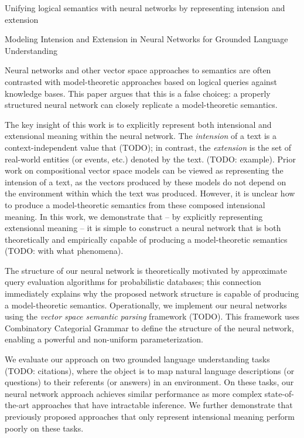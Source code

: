 

Unifying logical semantics with neural networks by representing intension and extension

Modeling Intension and Extension in Neural Networks for Grounded Language Understanding

Neural networks and other vector space approaches to semantics are
often contrasted with model-theoretic approaches based on logical
queries against knowledge bases. This paper argues that this is a
false choiceg: a properly structured neural network can closely
replicate a model-theoretic semantics.

The key insight of this work is to explicitly represent both
intensional and extensional meaning within the neural network. The
\emph{intension} of a text is a context-independent value that (TODO);
in contrast, the \emph{extension} is the set of real-world entities
(or events, etc.) denoted by the text. (TODO: example). Prior work on
compositional vector space models can be viewed as representing the
intension of a text, as the vectors produced by these models do not
depend on the environment within which the text was produced. However,
it is unclear how to produce a model-theoretic semantics from these
composed intensional meaning. In this work, we demonstrate that -- by
explicitly representing extensional meaning -- it is simple to
construct a neural network that is both theoretically and empirically
capable of producing a model-theoretic semantics (TODO: with what
phenomena).

The structure of our neural network is theoretically motivated by
approximate query evaluation algorithms for probabilistic databases;
this connection immediately explains why the proposed network
structure is capable of producing a model-theoretic
semantics. Operationally, we implement our neural networks using the
\emph{vector space semantic parsing} framework (TODO). This framework
uses Combinatory Categorial Grammar to define the structure of the
neural network, enabling a powerful and non-uniform parameterization.

We evaluate our approach on two grounded language understanding tasks
(TODO: citations), where the object is to map natural language
descriptions (or questions) to their referents (or answers) in an
environment. On these tasks, our neural network approach achieves
similar performance as more complex state-of-the-art approaches that
have intractable inference. We further demonstrate that previously
proposed approaches that only represent intensional meaning perform
poorly on these tasks.

